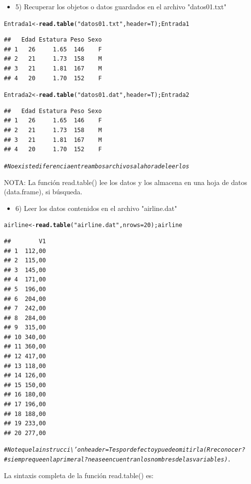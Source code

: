 \documentclass[12pt,letterpaper]{article}\usepackage[]{graphicx}\usepackage[]{color}
\makeatletter
\newcommand{\hlnum}[1]{\textcolor[rgb]{0.686,0.059,0.569}{#1}}%
\newcommand{\hlstr}[1]{\textcolor[rgb]{0.192,0.494,0.8}{#1}}%
\newcommand{\hlcom}[1]{\textcolor[rgb]{0.678,0.584,0.686}{\textit{#1}}}%
\newcommand{\hlstd}[1]{\textcolor[rgb]{0.345,0.345,0.345}{#1}}%
\newcommand{\hlkwb}[1]{\textcolor[rgb]{0.69,0.353,0.396}{#1}}%
\newcommand{\hlkwc}[1]{\textcolor[rgb]{0.333,0.667,0.333}{#1}}%
\newcommand{\hlkwd}[1]{\textcolor[rgb]{0.737,0.353,0.396}{\textbf{#1}}}%
\newenvironment{kframe}{%
 \def\at@end@of@kframe{}%
 \ifinner\ifhmode%
  \def\at@end@of@kframe{\end{minipage}}%
  \begin{minipage}{\columnwidth}%
 \fi\fi%
 \def\FrameCommand##1{\hskip\@totalleftmargin \hskip-\fboxsep
 \colorbox{shadecolor}{##1}\hskip-\fboxsep
     \hskip-\linewidth \hskip-\@totalleftmargin \hskip\columnwidth}%
 \MakeFramed {\advance\hsize-\width
   \@totalleftmargin\z@ \linewidth\hsize
   \@setminipage}}%
 {\par\unskip\endMakeFramed%
 \at@end@of@kframe}
\newenvironment{knitrout}{}{} %
\makeatother
\begin{document}
\newpage
\begin{itemize}
\item{5) } Recuperar los objetos o datos guardados en el archivo "datos01.txt" 
\end{itemize}
\begin{knitrout}
\color{fgcolor}\begin{kframe}
\begin{alltt}
\hlstd{Entrada1} \hlkwb{<-} \hlkwd{read.table}\hlstd{(}\hlstr{"datos01.txt"}\hlstd{,} \hlkwc{header}\hlstd{=T);Entrada1}
\end{alltt}
\begin{verbatim}
##   Edad Estatura Peso Sexo
## 1   26     1.65  146    F
## 2   21     1.73  158    M
## 3   21     1.81  167    M
## 4   20     1.70  152    F
\end{verbatim}
\begin{alltt}
\hlstd{Entrada2} \hlkwb{<-} \hlkwd{read.table}\hlstd{(}\hlstr{"datos01.dat"}\hlstd{,} \hlkwc{header}\hlstd{=T);Entrada2}
\end{alltt}
\begin{verbatim}
##   Edad Estatura Peso Sexo
## 1   26     1.65  146    F
## 2   21     1.73  158    M
## 3   21     1.81  167    M
## 4   20     1.70  152    F
\end{verbatim}
\begin{alltt}
\hlcom{# No existe diferencia entre ambos archivos a la hora de leerlos}
\end{alltt}
\end{kframe}
\end{knitrout}
NOTA: La funci\'on read.table() lee los datos y los almacena en una hoja de datos (data.frame), si b\'usqueda.
\begin{itemize}
\item{6) } Leer los datos contenidos en el archivo "airline.dat" 
\end{itemize}
\begin{knitrout}
\color{fgcolor}\begin{kframe}
\begin{alltt}
\hlstd{airline} \hlkwb{<-} \hlkwd{read.table}\hlstd{(}\hlstr{"airline.dat"}\hlstd{,}\hlkwc{nrows} \hlstd{=} \hlnum{20}\hlstd{);airline}
\end{alltt}
\begin{verbatim}
##        V1
## 1  112,00
## 2  115,00
## 3  145,00
## 4  171,00
## 5  196,00
## 6  204,00
## 7  242,00
## 8  284,00
## 9  315,00
## 10 340,00
## 11 360,00
## 12 417,00
## 13 118,00
## 14 126,00
## 15 150,00
## 16 180,00
## 17 196,00
## 18 188,00
## 19 233,00
## 20 277,00
\end{verbatim}
\begin{alltt}
\hlcom{# Note que la instrucci\textbackslash{}'on header=T es por defecto y puede omitirla (R reconocer? }
\hlcom{# siempre que en la primera l?nea se encuentran los nombres de las variables).}
\end{alltt}
\end{kframe}
\end{knitrout}
La sintaxis completa de la funci\'on read.table() es:\\
\end{document}
